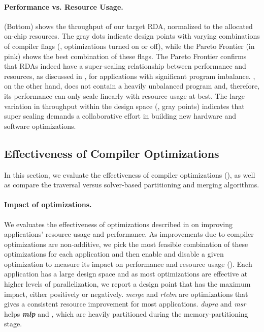 \paragraph{Performance vs. Resource Usage.}
 (Bottom) shows the throughput of our target RDA, normalized to the allocated on-chip resources.
The gray dots indicate design points with varying combinations of compiler flags (\ie, optimizations turned on or off), while the Pareto Frontier (in pink) shows the best combination of these flags.
The Pareto Frontier confirms that RDAs indeed have a super-scaling relationship between performance and resources, as discussed in , for applications with significant program imbalance.
, on the other hand, does not contain a heavily unbalanced program and, therefore, its performance can only scale linearly with resource usage at best.
The large variation in throughput within the design space (\ie, gray points) indicates that super scaling demands a collaborative effort in building new hardware and software optimizations.

\subsection{Effectiveness of Compiler Optimizations}
\label{ssec:evalopts}
In this section, we evaluate the effectiveness of compiler optimizations (), as well as compare the traversal versus solver-based partitioning and merging algorithms.

\paragraph{Impact of optimizations.}
We evaluates the effectiveness of optimizations described in  on improving applications' resource usage and performance.
As improvements due to compiler optimizations are non-additive, we pick the most feasible combination of these optimizations for each application and then enable and disable a given optimization to measure its impact on performance and resource usage ().
Each application has a large design space and as most optimizations are effective at higher levels of parallelization, we report a design point that has the maximum impact, either positively or negatively.
\emph{merge} and \emph{rtelm} are optimizations that gives a consistent resource improvement for most applications.
\emph{dupra} and \emph{msr} helps \emph{\bf mlp} and , which are heavily partitioned during the memory-partitioning stage.

